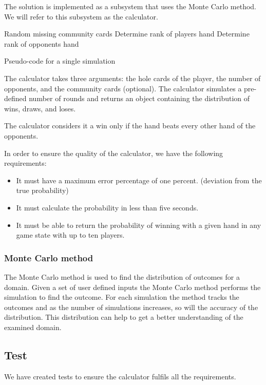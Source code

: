 The solution is implemented as a subsystem that uses the Monte Carlo method. We will refer to this subsystem as the calculator.

\LinesNumbered
\vspace{4mm}
\begin{algorithm}[H]
Random missing community cards\;
Determine rank of players hand\;
   {
    Determine rank of opponents hand\;
  }
  \;
\caption{Pseudo-code for a single simulation}
\end{algorithm}
\vspace{4mm}

The calculator takes three arguments: the hole cards of the player, the number of opponents, and the community cards (optional). The calculator simulates a pre-defined number of rounds and returns an object containing the distribution of wins, draws, and loses.

The calculator considers it a win only if the hand beats every other hand of the opponents.

In order to ensure the quality of the calculator, we have the following requirements:
\begin{itemize}
\item It must have a maximum error percentage of one percent. (deviation from the true probability)
\item It must calculate the probability in less than five seconds.
\item It must be able to return the probability of winning with a given hand in any game state with up to ten players.
\end{itemize}

\subsubsection{Monte Carlo method}
The Monte Carlo method is used to find the distribution of outcomes for a domain. Given a set of user defined inputs the Monte Carlo method performs the simulation to find the outcome. For each simulation the method tracks the outcomes and as the number of simulations increases, so will the accuracy of the distribution. This distribution can help to get a better understanding of the examined domain.

\subsection{Test}
We have created tests to ensure the calculator fulfils all the requirements. 
 
